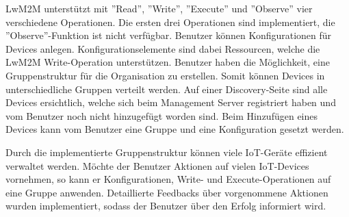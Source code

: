 LwM2M unterstützt mit ''Read'', ''Write'', ''Execute'' und ''Observe'' vier verschiedene Operationen. Die ersten drei Operationen sind implementiert, die ''Observe''-Funktion ist nicht verfügbar. Benutzer können Konfigurationen für Devices anlegen. Konfigurationselemente sind dabei Ressourcen, welche die LwM2M Write-Operation unterstützen. Benutzer haben die Möglichkeit, eine Gruppenstruktur für die Organisation zu erstellen. Somit können Devices in unterschiedliche Gruppen verteilt werden. Auf einer Discovery-Seite sind alle Devices ersichtlich, welche sich beim Management Server registriert haben und vom Benutzer noch nicht hinzugefügt worden sind. Beim Hinzufügen eines Devices kann vom Benutzer eine Gruppe und eine Konfiguration gesetzt werden.

Durch die implementierte Gruppenstruktur können viele IoT-Geräte effizient verwaltet werden. Möchte der Benutzer Aktionen auf vielen IoT-Devices vornehmen, so kann er Konfigurationen, Write- und Execute-Operationen auf eine Gruppe anwenden. Detaillierte Feedbacks über vorgenommene Aktionen wurden implementiert, sodass der Benutzer über den Erfolg informiert wird.